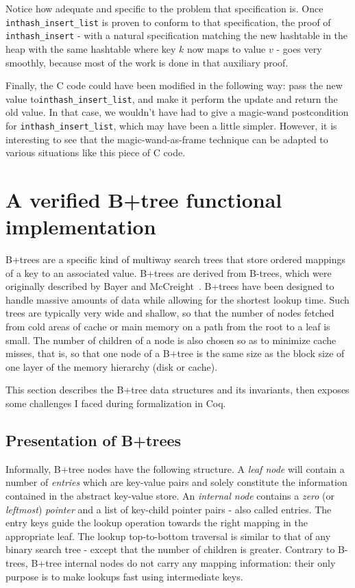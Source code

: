 \documentclass[11pt]{article}
\def\ce{\lstinline[language=C, breaklines=true, columns=fixed]}
\begin{document}
{Notice how adequate and specific to the problem that specification is. Once \ce{inthash_insert_list} is proven to conform to that specification, the proof of \ce{inthash_insert} - with a natural specification matching the new hashtable in the heap with the same hashtable where key $k$ now maps to value $v$ - goes very smoothly, because most of the work is done in that auxiliary proof.

Finally, the C code could have been modified in the following way: pass the new value to\linebreak\ce{inthash_insert_list}, and make it perform the update and return the old value. In that case, we wouldn't have had to give a magic-wand postcondition for \ce{inthash_insert_list}, which may have been a little simpler. However, it is interesting to see that the magic-wand-as-frame technique can be adapted to various situations like this piece of C code.

\section{A verified B+tree functional implementation}
\label{btree_section}
B+trees are a specific kind of multiway search trees that store ordered mappings of a key to an associated value. B+trees are derived from B-trees, which were originally described by Bayer and McCreight~\cite{OMLOI}. B+trees have been designed to handle massive amounts of data while allowing for the shortest lookup time. Such trees are typically very wide and shallow, so that the number of nodes fetched from cold areas of cache or main memory on a path from the root to a leaf is small. The number of children of a node is also chosen so as to minimize cache misses, that is, so that one node of a B+tree is the same size as the block size of one layer of the memory hierarchy (disk or cache).

This section describes the B+tree data structures and its invariants, then exposes some challenges I faced during formalization in Coq.

\subsection{Presentation of B+trees}
\label{btree_maths}
Informally, B+tree nodes have the following structure. A \emph{leaf node} will contain a number of \emph{entries} which are key-value pairs and solely constitute the information contained in the abstract key-value store.
An \emph{internal node} contains a \emph{zero} (or \emph{leftmost}) \emph{pointer} and a list of key-child pointer pairs - also called entries. The entry keys guide the lookup operation towards the right mapping in the appropriate leaf. The lookup top-to-bottom traversal is similar to that of any binary search tree - except that the number of children is greater. Contrary to B-trees, B+tree internal nodes do not carry any mapping information: their only purpose is to make lookups fast using intermediate keys. 

}
\end{document}
